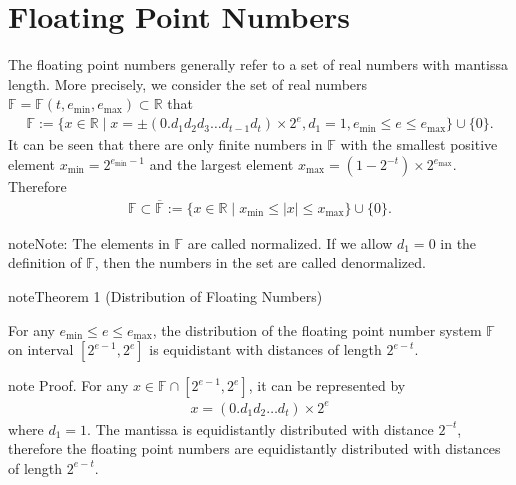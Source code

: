 \documentclass[letterpaper,10pt,english]{jupyterBook}
\begin{document}
\section{Floating Point Numbers}
\label{\detokenize{floating_point:floating-point-numbers}}
\sphinxAtStartPar
The floating point numbers generally refer to a set of real numbers with  mantissa length. More precisely, we consider the set of real numbers \(\mathbb{F} = \mathbb{F}(t, e_{\min}, e_{\max})\subset \mathbb{R}\) that
\begin{equation*}
\begin{split}\mathbb{F} := \{x\in \mathbb{R} \mid x = \pm (0.d_1 d_2 d_3\dots d_{t-1} d_t) \times 2^e, d_1 =1,  e_{\min}\le e\le e_{\max}\}\cup \{0\}.\end{split}
\end{equation*}
\sphinxAtStartPar
It can be seen that there are only finite numbers in \(\mathbb{F}\) with the smallest positive element \(x_{\min} = 2^{e_{\min}-1}\) and the largest element \(x_{\max} = ( 1- 2^{-t} )\times 2^{e_{\max} }\). Therefore
\begin{equation*}
\begin{split}\mathbb{F}\subset \overline{\mathbb{F}}:= \{ x\in \mathbb{R}\mid x_{\min} \le |x| \le x_{\max}\}\cup \{ 0\}.\end{split}
\end{equation*}
\begin{sphinxadmonition}{note}{Note:}
\sphinxAtStartPar
The elements in \(\mathbb{F}\) are called normalized. If we  allow \(d_1 = 0\) in the definition of \(\mathbb{F}\), then the numbers in the set are called denormalized.
\end{sphinxadmonition}
\label{floating_point:THM-Di-Fl-Nu}
\begin{sphinxadmonition}{note}{Theorem 1 (Distribution of Floating Numbers)}



\sphinxAtStartPar
For any \(e_{\min} \le e\le e_{\max}\), the distribution of the floating point number system \(\mathbb{F}\) on interval \([2^{e-1}, 2^e]\) is equidistant with distances of length \(2^{e-t}\).
\end{sphinxadmonition}

\begin{sphinxadmonition}{note}
\sphinxAtStartPar
Proof. For any  \(x \in \mathbb{F}\cap [2^{e-1}, 2^e]\), it can be represented by
\begin{equation*}
\begin{split}x = (0.d_1d_2\dots d_t)\times 2^{e}\end{split}
\end{equation*}
\sphinxAtStartPar
where \(d_1 = 1\). The mantissa is equidistantly distributed with distance \(2^{-t}\), therefore the floating point numbers are equidistantly distributed with distances of length \(2^{e-t}\).
\end{sphinxadmonition}
\end{document}
